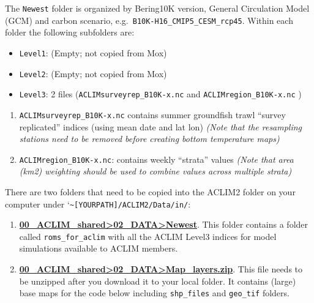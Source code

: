 \documentclass[
]{article}
\providecommand{\tightlist}{%
  \setlength{\itemsep}{0pt}\setlength{\parskip}{0pt}}
\begin{document}
The \texttt{Newest} folder is organized by Bering10K version, General
Circulation Model (GCM) and carbon scenario,
e.g.~\texttt{B10K-H16\_CMIP5\_CESM\_rcp45}. Within each folder the
following subfolders are:

\begin{itemize}
\tightlist
\item
  \texttt{Level1}: (Empty; not copied from Mox)
\item
  \texttt{Level2}: (Empty; not copied from Mox)
\item
  \texttt{Level3}: 2 files (\texttt{ACLIMsurveyrep\_B10K-x.nc} and
  \texttt{ACLIMregion\_B10K-x.nc} )
\end{itemize}

\begin{enumerate}
\def\labelenumi{\arabic{enumi})}
\tightlist
\item
  \texttt{ACLIMsurveyrep\_B10K-x.nc} contains summer groundfish trawl
  ``survey replicated'' indices (using mean date and lat lon)
  \emph{(Note that the resampling stations need to be removed before
  creating bottom temperature maps)}\\
\item
  \texttt{ACLIMregion\_B10K-x.nc}: contains weekly ``strata'' values
  \emph{(Note that area (km2) weighting should be used to combine values
  across multiple strata)}
\end{enumerate}

There are two folders that need to be copied into the ACLIM2 folder on
your computer under
`\texttt{\textasciitilde{}{[}YOURPATH{]}/ACLIM2/Data/in/}:

\begin{enumerate}
\def\labelenumi{\arabic{enumi})}
\item
  \href{https://drive.google.com/drive/u/0/folders/0Bx7wdZllbuF9eDJndkhCS2EwQUk}{\textbf{00\_ACLIM\_shared\textgreater02\_DATA\textgreater Newest}}.
  This folder contains a folder called \texttt{roms\_for\_aclim} with
  all the ACLIM Level3 indices for model simulations available to ACLIM
  members.
\item
  \href{https://drive.google.com/drive/u/0/folders/0Bx7wdZllbuF9eDJndkhCS2EwQUk}{\textbf{00\_ACLIM\_shared\textgreater02\_DATA\textgreater Map\_layers.zip}}.
  This file needs to be unzipped after you download it to your local
  folder. It contains (large) base maps for the code below including
  \texttt{shp\_files} and \texttt{geo\_tif} folders.
\end{enumerate}
\end{document}
